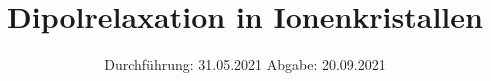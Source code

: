 

\subject{V 48}
\title{Dipolrelaxation in Ionenkristallen}
\date{%
  Durchführung: 31.05.2021
  \hspace{3em}
  Abgabe: 20.09.2021
}



\maketitle
\thispagestyle{empty}
\tableofcontents
\newpage







\printbibliography{}


